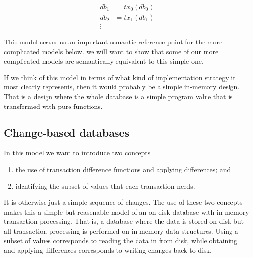 \documentclass[11pt,a4paper]{article}
\begin{document}
\begin{center}
\begin{align*}
 \mathit{db}_1 & = \mathit{tx}_0(\mathit{db}_0) \\
 \mathit{db}_2 & = \mathit{tx}_1(\mathit{db}_1) \\
 \vdots
\end{align*}
\end{center}
This model serves as an important semantic reference point for the more
complicated models below. we will want to show that some of our more
complicated models are semantically equivalent to this simple one.

If we think of this model in terms of what kind of implementation strategy it
most clearly represents, then it would probably be a simple in-memory design.
That is a design where the whole database is a simple program value that is
transformed with pure functions.

\subsection{Change-based databases}

In this model we want to introduce two concepts
\begin{enumerate}
\item the use of transaction difference functions and applying differences; and
\item identifying the subset of values that each transaction needs.
\end{enumerate}
It is otherwise just a simple sequence of changes. The use of these two concepts
makes this a simple but reasonable model of an on-disk database with in-memory
transaction processing. That is, a database where the data is stored on disk
but all transaction processing is performed on in-memory data structures. Using
a subset of values corresponds to reading the data in from disk, while obtaining
and applying differences corresponds to writing changes back to disk.
\end{document}
